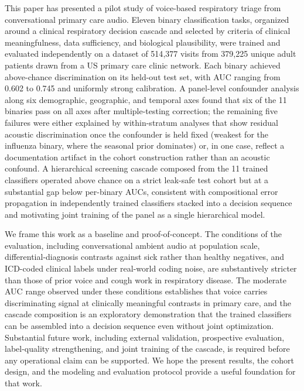 \documentclass[utf8]{FrontiersinHarvard} %
\begin{document}
This paper has presented a pilot study of voice-based respiratory triage from conversational primary care audio. Eleven binary classification tasks, organized around a clinical respiratory decision cascade and selected by criteria of clinical meaningfulness, data sufficiency, and biological plausibility, were trained and evaluated independently on a dataset of 514{,}377 visits from 379{,}225 unique adult patients drawn from a US primary care clinic network. Each binary achieved above-chance discrimination on its held-out test set, with AUC ranging from 0.602 to 0.745 and uniformly strong calibration. A panel-level confounder analysis along six demographic, geographic, and temporal axes found that six of the 11 binaries pass on all axes after multiple-testing correction; the remaining five failures were either explained by within-stratum analyses that show residual acoustic discrimination once the confounder is held fixed (weakest for the influenza binary, where the seasonal prior dominates) or, in one case, reflect a documentation artifact in the cohort construction rather than an acoustic confound. A hierarchical screening cascade composed from the 11 trained classifiers operated above chance on a strict leak-safe test cohort but at a substantial gap below per-binary AUCs, consistent with compositional error propagation in independently trained classifiers stacked into a decision sequence and motivating joint training of the panel as a single hierarchical model.

We frame this work as a baseline and proof-of-concept. The conditions of the evaluation, including conversational ambient audio at population scale, differential-diagnosis contrasts against sick rather than healthy negatives, and ICD-coded clinical labels under real-world coding noise, are substantively stricter than those of prior voice and cough work in respiratory disease. The moderate AUC range observed under these conditions establishes that voice carries discriminating signal at clinically meaningful contrasts in primary care, and the cascade composition is an exploratory demonstration that the trained classifiers can be assembled into a decision sequence even without joint optimization. Substantial future work, including external validation, prospective evaluation, label-quality strengthening, and joint training of the cascade, is required before any operational claim can be supported. We hope the present results, the cohort design, and the modeling and evaluation protocol provide a useful foundation for that work.
\end{document}
